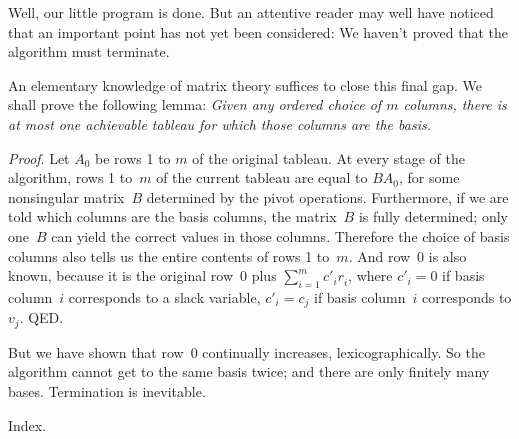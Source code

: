 Well, our little program is done. But an attentive reader may
well have
noticed that an important point has not yet been considered: We haven't proved
that the algorithm must terminate.

An elementary knowledge of matrix theory suffices to close this final
gap. We shall prove the following lemma: {\sl Given any ordered choice of
$m$ columns, there is at most one achievable tableau for which those columns
are the basis.}

{\it Proof}.
Let $A_0$ be rows 1 to $m$ of the original tableau. At every stage of
the algorithm, rows 1 to~$m$ of the current tableau are equal to $BA_0$,
for some nonsingular matrix~$B$ determined by the pivot operations.
Furthermore, if we are told which columns are the basis columns, the
matrix~$B$ is fully determined; only one~$B$ can yield the correct
values in those columns. Therefore the choice of basis columns also
tells us the entire contents of rows 1 to~$m$. And row~0 is also known,
because it is the original row~0 plus $\sum_{i=1}^m c'_ir^{\phantom\prime}_i$,
where $c'_i=0$ if basis column~$i$ corresponds to a slack variable,
$c'_i=c_j$ if basis column~$i$ corresponds to $v_j$. QED.

But we have shown that row~0 continually increases, lexicographically.
So the algorithm cannot get to the same basis twice; and there are
only finitely many bases. Termination is inevitable.

\fi

Index.
\fi

\inx
\fin
\con
